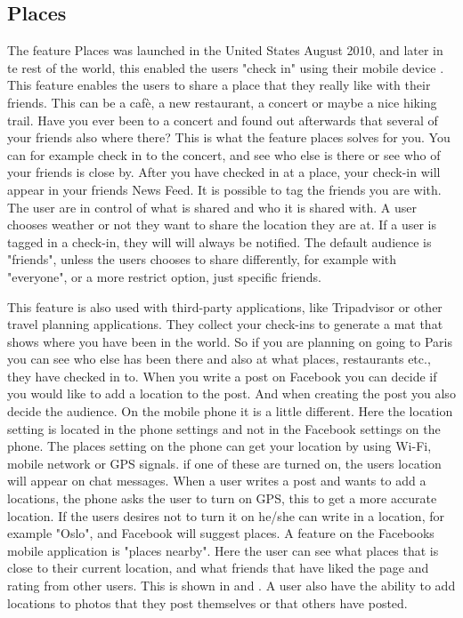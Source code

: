 \subsection{Places}
The feature Places was launched in the United States August 2010, and later in te rest of the world, this enabled the users "check in" using their mobile device \cite{checkIn}. This feature enables the users to share a place that they really like with their friends. This can be a cafè, a new restaurant, a concert or maybe a nice hiking trail. Have you ever been to a concert and found out afterwards that several of your friends also where there? This is what the feature places solves for you. You can for example check in to the concert, and see who else is there or see who of your friends is close by. After you have checked in at a place, your check-in will appear in your friends News Feed. It is possible to tag the friends you are with. The user are in control of what is shared and who it is shared with. A user chooses weather or not they want to share the location they are at. If a user is tagged in a check-in, they will will always be notified. The default audience is "friends", unless the users chooses to share differently, for example with "everyone", or a more restrict option, just specific friends. 

This feature is also used with third-party applications, like Tripadvisor or other travel planning applications. They collect your check-ins to generate a mat that shows where you have been in the world. So if you are planning on going to Paris you can see who else has been there and also at what places, restaurants etc., they have checked in to. 
When you write a post on Facebook you can decide if you would like to add a location to the post. And when creating the post you also decide the audience. On the mobile phone it is a little different. Here the location setting is located in the phone settings and not in the Facebook settings on the phone. The places setting on the phone can get your location by using Wi-Fi, mobile network or GPS signals. if one of these are turned on, the users location will appear on chat messages. When a user writes a post and wants to add a locations, the phone asks the user to turn on GPS, this to get a more accurate location. If the users desires not to turn it on he/she can write in a location, for example "Oslo", and Facebook will suggest places. A feature on the Facebooks mobile application is "places nearby". Here the user can see what places that is close to their current location, and what friends that have liked the page and rating from other users. This is shown in  and . A user also have the ability to add locations to photos that they post themselves or that others have posted. 


